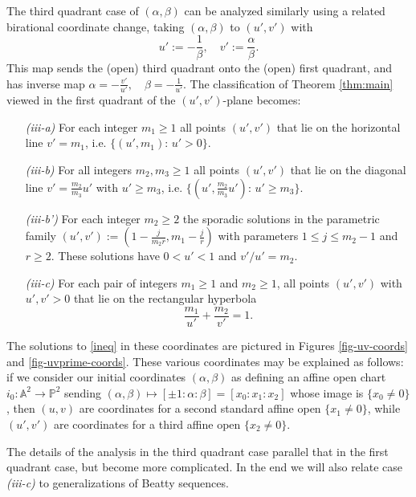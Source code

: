 \documentclass[12pt,letterpaper, reqno]{amsart}
\theoremstyle{definition}
\theoremstyle{remark}
\renewcommand{\AA}{\mathbb{A}}
\newcommand{\PP}{\mathbb{P}}
\newcommand{\uu}{{u'}}
\newcommand{\vv}{{v'}}
\begin{document}
The third quadrant case  of $(\alpha, \beta)$ can be  analyzed similarly using  a related birational coordinate change, 
taking $(\alpha, \beta)$ to $(\uu, \vv)$ with  
$$\uu := -\frac{1}{\beta}, \quad  \vv := \frac{\alpha}{\beta}.$$ 
This map sends  the  (open) third quadrant onto the (open) first quadrant, and has inverse map
$\alpha= -\frac{\vv}{\uu}, \quad \beta= -\frac{1}{\uu}.$
 The classification of Theorem \ref{thm:main} viewed in  the first quadrant of the $(\uu, \vv)$-plane  becomes:
\begin{enumerate}
\item[{\it (iii-a)}] For each integer $m_1 \ge 1$ all points $(\uu, \vv)$ that lie  on the horizontal line $\vv={m_1}$, i.e. 
$\{(\uu, {m_1}): \, \uu >0 \}$.

\item[{\it (iii-b)}] For all  integers $m_2, m_3 \ge 1$ all points $(\uu, \vv)$ that lie on the diagonal line  $\vv= \frac{m_2}{m_3}\uu$
with $\uu \ge {m_3}$, i.e. $\{(\uu,\frac{m_2}{m_3}\uu): \,  \uu \geq {m_3} \}$.

\item[\it (iii-b')] For each integer $m_2 \ge 2$ the  sporadic solutions in the parametric family $(\uu, \vv) := (1-\frac{j}{m_2 r}, m_1-\frac{j}{r})$
with parameters  $ 1 \le j \le m_2 -1$ and $ r\ge 2$. 
These solutions have
$0 <\uu < 1$ and  $\vv/\uu =m_2$.

\item[{\it (iii-c)}] For each pair of integers $m_1\ge 1$ and $m_2 \ge 1$, all points $(\uu, \vv)$  with $\uu, \vv>0$ that lie on the rectangular hyperbola
$$\frac{m_1}{\uu}  + \frac{m_2 }{\vv} =1.$$

\end{enumerate} 

The solutions to \eqref{ineq} in these coordinates are pictured in Figures \ref{fig-uv-coords} and \ref{fig-uvprime-coords}.
These various coordinates may be explained as follows: if we consider our initial coordinates $(\alpha,\beta)$ as defining an affine open chart $i_0:\AA^2 \to \PP^2$ sending $(\alpha,\beta)\mapsto [\pm 1:\alpha:\beta] = [x_0:x_1:x_2]$ whose image is $\{x_0\neq 0\}$, then  $(u,v)$ are coordinates for a second standard affine open $\{x_1\neq 0\}$, while $(\uu,\vv)$ are coordinates for a third affine open $\{x_2\neq 0\}$. 

The details of the analysis in the third quadrant case parallel that in the first quadrant case,
but become more complicated.   In  the end we will also relate  case {\it (iii-c)} to 
generalizations of Beatty sequences.
\end{document}
